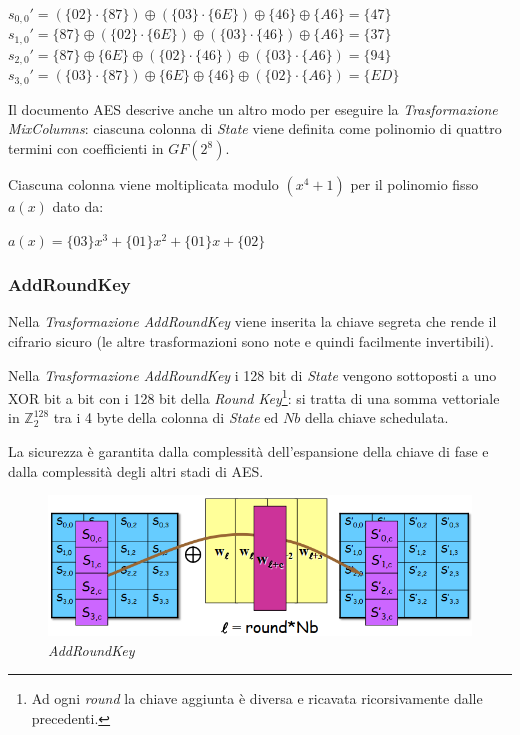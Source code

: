 \documentclass[a4paper,11pt]{article}
\begin{document}
\begin{center}
    \begin{center}
        $s_{0, 0}' = (\{02\} \cdot \{87\}) \oplus (\{03\} \cdot \{6E\}) \oplus \{46\} \oplus \{A6\} = \{47\}$\bigbreak
        $s_{1, 0}' = \{87\} \oplus (\{02\} \cdot \{6E\}) \oplus (\{03\} \cdot \{46\}) \oplus \{A6\} = \{37\}$\bigbreak
        $s_{2, 0}' = \{87\} \oplus \{6E\} \oplus (\{02\} \cdot \{46\}) \oplus (\{03\} \cdot \{A6\}) = \{94\}$\bigbreak
        $s_{3, 0}' = (\{03\} \cdot \{87\}) \oplus \{6E\} \oplus \{46\} \oplus (\{02\} \cdot \{A6\}) = \{ED\}$
    \end{center}
\end{center}

\bigbreak
Il documento AES descrive anche un altro modo per eseguire la \textit{Trasformazione MixColumns}: ciascuna colonna di \textit{State} viene definita come polinomio di quattro termini con coefficienti in $GF(2^8)$.

Ciascuna colonna viene moltiplicata modulo $(x^4 + 1)$ per il polinomio fisso $a(x)$ dato da:
\begin{center}
    $a(x) = \{03\}x^3 + \{01\}x^2 + \{01\}x + \{02\}$
\end{center}

\subsubsection{AddRoundKey}
Nella \textit{Trasformazione AddRoundKey} viene inserita la chiave segreta che rende il cifrario sicuro (le altre trasformazioni sono note e quindi facilmente invertibili).

Nella \textit{Trasformazione AddRoundKey} i 128 bit di \textit{State} vengono sottoposti a uno XOR bit a bit con i 128 bit della \textit{Round Key}\footnote{Ad ogni \textit{round} la chiave aggiunta è diversa e ricavata ricorsivamente dalle precedenti.}: si tratta di una somma vettoriale in $\mathbb{Z}_2^{128}$ tra i 4 byte della colonna di \textit{State} ed $Nb$ della chiave schedulata.

La sicurezza è garantita dalla complessità dell'espansione della chiave di fase e dalla complessità degli altri stadi di AES.
\begin{figure}[H]
    \centering
    \includegraphics[scale=0.5]{addroundkey}
    \caption{\textit{AddRoundKey}}
\end{figure}
\end{document}
